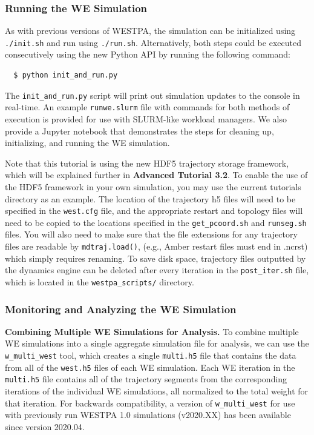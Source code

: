 \subsubsection{Running the WE Simulation}
As with previous versions of WESTPA, the simulation can be initialized using \verb|./init.sh| and run using \verb|./run.sh|. 
Alternatively, both steps could be executed consecutively using the new Python API by running the following command:

\begin{verbatim}
  $ python init_and_run.py
\end{verbatim}

The \verb|init_and_run.py| script will print out simulation updates to the console in real-time. 
An example \verb|runwe.slurm| file with commands for both methods of execution is provided for use with SLURM-like workload managers. 
We also provide a Jupyter notebook that demonstrates the steps for cleaning up, initializing, and running the WE simulation.

Note that this tutorial is using the new HDF5 trajectory storage framework, which will be explained further in \textbf{Advanced Tutorial 3.2}. 
To enable the use of the HDF5 framework in your own simulation, you may use the current tutorials directory as an example. 
The location of the trajectory h5 files will need to be specified in the \verb|west.cfg| file, and the appropriate restart and topology files will need to be copied to the locations specified in the \verb|get_pcoord.sh| and \verb|runseg.sh| files. 
You will also need to make sure that the file extensions for any trajectory files are readable by \verb|mdtraj.load()|, (e.g., Amber restart files must end in .ncrst) which simply requires renaming. 
To save disk space, trajectory files outputted by the dynamics engine can be deleted after every iteration in the \verb|post_iter.sh| file, which is located in the \verb|westpa_scripts/| directory.

\subsubsection{Monitoring and Analyzing the WE Simulation}

\textbf{Combining Multiple WE Simulations for Analysis.} To combine multiple WE simulations into a single aggregate simulation file for analysis, we can use the \verb|w_multi_west| tool, which creates a single \verb|multi.h5| file that contains the data from all of the \verb|west.h5| files of each WE simulation. 
Each WE iteration in the \verb|multi.h5| file contains all of the trajectory segments from the corresponding iterations of the individual WE simulations, all normalized to the total weight for that iteration. 
For backwards compatibility, a version of \verb|w_multi_west| for use with previously run WESTPA 1.0 simulations (v2020.XX) has been available since version 2020.04.


